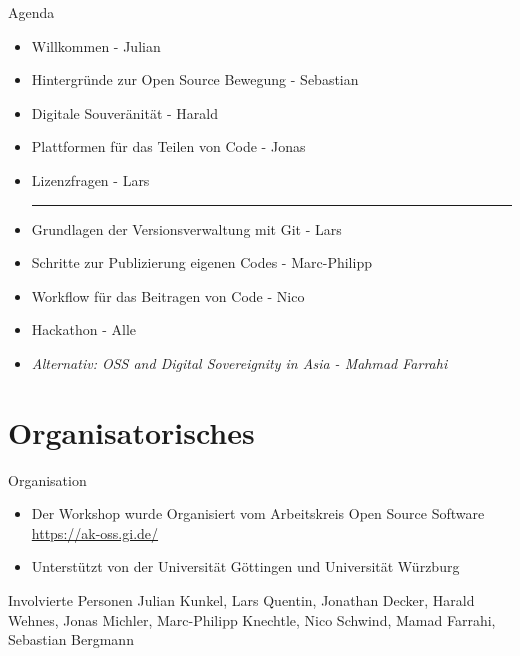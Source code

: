 \documentclass[compress,aspectratio=169]{beamer}
\begin{document}
\begin{frame}{Agenda}
  \begin{itemize}
    \item Willkommen - Julian
    \item Hintergründe zur Open Source Bewegung - Sebastian
    \item Digitale Souveränität - Harald
    \item Plattformen für das Teilen von Code - Jonas
    \item Lizenzfragen - Lars \\
    \hrule
    \item Grundlagen der Versionsverwaltung mit Git - Lars
    \item Schritte zur Publizierung eigenen Codes - Marc-Philipp
    \item Workflow für das Beitragen von Code - Nico
    \item Hackathon - Alle 
    \item \textit{Alternativ: OSS and Digital Sovereignity in Asia - Mahmad Farrahi}
  \end{itemize}
\end{frame}

\section{Organisatorisches}

\sectionIntroHidden

\begin{frame}{Organisation}
  \begin{itemize}
    \item Der Workshop wurde Organisiert vom Arbeitskreis Open Source Software \\
    \url{https://ak-oss.gi.de/}
    \item Unterstützt von der Universität Göttingen und Universität Würzburg
  \end{itemize}


  \begin{block}{Involvierte Personen}
    Julian Kunkel,
    Lars Quentin,
    Jonathan Decker,
    Harald Wehnes,
    Jonas Michler,
    Marc-Philipp Knechtle,
    Nico Schwind,
    Mamad Farrahi,
    Sebastian Bergmann
  \end{block}
\end{frame}
\end{document}
